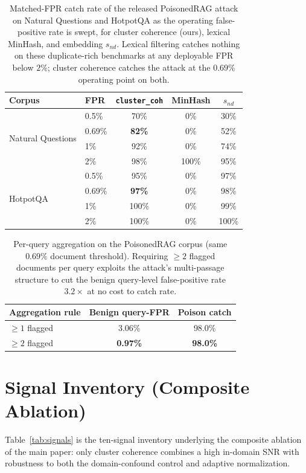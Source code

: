 \documentclass[lettersize,journal]{IEEEtran}
\begin{document}
\begin{table}[H]
\centering
\caption{Matched-FPR catch rate of the released PoisonedRAG attack on Natural
Questions and HotpotQA as the operating false-positive rate is swept, for cluster
coherence (ours), lexical MinHash, and embedding $s_{nd}$. Lexical filtering catches
nothing on these duplicate-rich benchmarks at any deployable FPR below $2\%$; cluster coherence
catches the attack at the $0.69\%$ operating point on both.}
\label{tab:roc}
\begin{tabular}{llccc}
\toprule
Corpus & FPR & \texttt{cluster\_coh} & MinHash & $s_{nd}$ \\
\midrule
\multirow{4}{*}{Natural Questions}
 & 0.5\%  & 70\% & 0\%   & 30\% \\
 & 0.69\% & \textbf{82\%} & 0\% & 52\% \\
 & 1\%    & 92\% & 0\%   & 74\% \\
 & 2\%    & 98\% & 100\% & 95\% \\
\midrule
\multirow{4}{*}{HotpotQA}
 & 0.5\%  & 95\%  & 0\% & 97\% \\
 & 0.69\% & \textbf{97\%} & 0\% & 98\% \\
 & 1\%    & 100\% & 0\% & 99\% \\
 & 2\%    & 100\% & 0\% & 100\% \\
\bottomrule
\end{tabular}
\end{table}

\begin{table}[H]
\centering
\caption{Per-query aggregation on the PoisonedRAG corpus (same $0.69\%$ document
threshold). Requiring $\geq\!2$ flagged documents per query exploits the attack's
multi-passage structure to cut the benign query-level false-positive rate
$3.2\times$ at no cost to catch rate.}
\label{tab:agg}
\begin{tabular}{lcc}
\toprule
Aggregation rule & Benign query-FPR & Poison catch \\
\midrule
$\geq\!1$ flagged & 3.06\% & 98.0\% \\
$\geq\!2$ flagged & \textbf{0.97\%} & \textbf{98.0\%} \\
\bottomrule
\end{tabular}
\end{table}

\section{Signal Inventory (Composite Ablation)}
\label{app:signals}
Table~\ref{tab:signals} is the ten-signal inventory underlying the composite ablation of the
main paper: only cluster coherence combines a high in-domain SNR with robustness to both the
domain-confound control and adaptive normalization.
\end{document}
